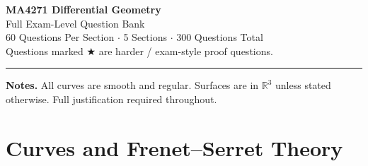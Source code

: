 \documentclass[11pt, a4paper]{article}
\newcommand{\R}{\mathbb{R}}
\begin{document}

\begin{center}
  {\LARGE \textbf{MA4271 Differential Geometry}}\\[8pt]
  {\large Full Exam-Level Question Bank}\\[4pt]
  {\normalsize 60 Questions Per Section $\cdot$ 5 Sections $\cdot$ 300 Questions Total}\\[4pt]
  {\small Questions marked \textbf{$\bigstar$} are harder / exam-style proof questions.}\\[6pt]
  \textcolor{gray}{\rule{0.6\linewidth}{0.4pt}}
\end{center}

\vspace{0.3em}
\noindent\textbf{Notes.} All curves are smooth and regular. Surfaces are in $\R^3$ unless stated otherwise. Full justification required throughout.

\vspace{1em}
\tableofcontents
\newpage

\section{Curves and Frenet--Serret Theory}
\end{document}
